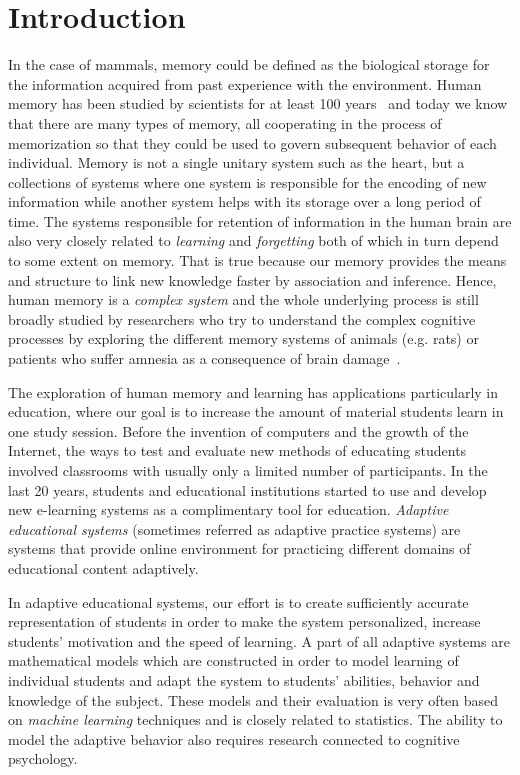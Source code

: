 \chapter{Introduction}

In the case of mammals, memory could be defined as the biological storage for the information acquired from past experience with the environment. Human memory has been studied by scientists for at least 100 years~\cite{baddeley1997human} and today we know that there are many types of memory, all cooperating in the process of memorization so that they could be used to govern subsequent behavior of each individual. Memory is not a single unitary system such as the heart, but a collections of systems where one system is responsible for the encoding of new information while another system helps with its storage over a long period of time. The systems responsible for retention of information in the human brain are also very closely related to \textit{learning} and \textit{forgetting} both of which in turn depend to some extent on memory. That is true because our memory provides the means and structure to link new knowledge faster by association and inference. Hence, human memory is a \textit{complex system} and the whole underlying process is still broadly studied by researchers who try to understand the complex cognitive processes by exploring the different memory systems of animals (e.g. rats) or patients who suffer amnesia as a consequence of brain damage~\cite{mcclelland1995there}.

The exploration of human memory and learning has applications particularly in education, where our goal is to increase the amount of material students learn in one study session. Before the invention of computers and the growth of the Internet, the ways to test and evaluate new methods of educating students involved classrooms with usually only a limited number of participants. In the last 20 years, students and educational institutions started to use and develop new e-learning systems as a complimentary tool for education. \textit{Adaptive educational systems} (sometimes referred as adaptive practice systems) are systems that provide online environment for practicing different domains of educational content adaptively.

In adaptive educational systems, our effort is to create sufficiently accurate representation of students in order to make the system personalized, increase students' motivation and the speed of learning. A part of all adaptive systems are mathematical models which are constructed in order to model learning of individual students and adapt the system to students' abilities, behavior and knowledge of the subject. These models and their evaluation is very often based on \textit{machine learning} techniques and is closely related to statistics. The ability to model the adaptive behavior also requires research connected to cognitive psychology.

